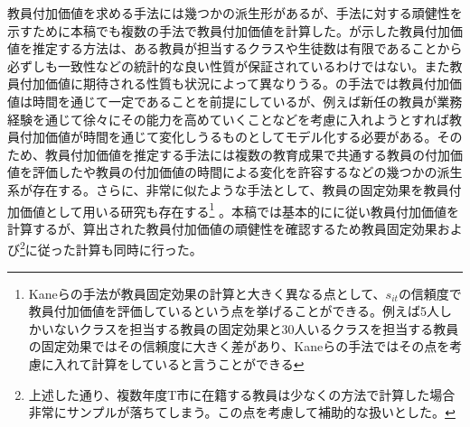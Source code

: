 \documentclass[a4paper,12pt]{article}
\begin{document}
教員付加価値を求める手法には幾つかの派生形があるが、手法に対する頑健性を示すために本稿でも複数の手法で教員付加価値を計算した。\cite{kane2008estimating}が示した教員付加価値を推定する方法は、ある教員が担当するクラスや生徒数は有限であることから必ずしも一致性などの統計的な良い性質が保証されているわけではない。また教員付加価値に期待される性質も状況によって異なりうる。\cite{kane2008estimating}の手法では教員付加価値は時間を通じて一定であることを前提にしているが、例えば新任の教員が業務経験を通じて徐々にその能力を高めていくことなどを考慮に入れようとすれば教員付加価値が時間を通じて変化しうるものとしてモデル化する必要がある。そのため、教員付加価値を推定する手法には複数の教育成果で共通する教員の付加価値を評価した\cite{lefgren2012using}や教員の付加価値の時間による変化を許容する\cite{chetty2014measuring}などの幾つかの派生系が存在する。さらに、非常に似たような手法として、教員の固定効果を教員付加価値として用いる研究も存在する\footnote{Kaneらの手法が教員固定効果の計算と大きく異なる点として、$s_{it}$の信頼度で教員付加価値を評価しているという点を挙げることができる。例えば5人しかいないクラスを担当する教員の固定効果と30人いるクラスを担当する教員の固定効果ではその信頼度に大きく差があり、Kaneらの手法ではその点を考慮に入れて計算をしていると言うことができる} 。本稿では基本的に\cite{kane2008estimating}に従い教員付加価値を計算するが、算出された教員付加価値の頑健性を確認するため教員固定効果および\cite{chetty2014measuring}\footnote{上述した通り、複数年度T市に在籍する教員は少なく\cite{chetty2014measuring}の方法で計算した場合非常にサンプルが落ちてしまう。この点を考慮して補助的な扱いとした。}に従った計算も同時に行った。
\end{document}
